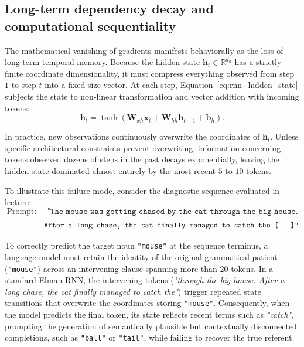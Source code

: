 \documentclass[../../../main.tex]{subfiles}
\begin{document}
\subsection{Long-term dependency decay and computational sequentiality}
\label{subsec:rnn_long_term_decay_sequentiality}

The mathematical vanishing of gradients manifests behaviorally as the loss of long-term temporal memory. Because the hidden state $\mathbf{h}_t \in \mathbb{R}^{d_h}$ has a strictly finite coordinate dimensionality, it must compress everything observed from step $1$ to step $t$ into a fixed-size vector. At each step, Equation~\ref{eq:rnn_hidden_state} subjects the state to non-linear transformation and vector addition with incoming tokens:
\begin{equation}
\mathbf{h}_t = \tanh\left(\mathbf{W}_{xh} \mathbf{x}_t + \mathbf{W}_{hh} \mathbf{h}_{t-1} + \mathbf{b}_h\right).
\end{equation}

In practice, new observations continuously overwrite the coordinates of $\mathbf{h}_t$. Unless specific architectural constraints prevent overwriting, information concerning tokens observed dozens of steps in the past decays exponentially, leaving the hidden state dominated almost entirely by the most recent $5$ to $10$ tokens.

To illustrate this failure mode, consider the diagnostic sequence evaluated in lecture:
\begin{equation}
\text{Prompt: } \quad \texttt{"The mouse was getting chased by the cat through the big house.}
\end{equation}
\begin{equation}
\quad \quad \quad \quad \quad \texttt{After a long chase, the cat finally managed to catch the [ \quad ]"}
\end{equation}

To correctly predict the target noun \texttt{"mouse"} at the sequence terminus, a language model must retain the identity of the original grammatical patient (\texttt{"mouse"}) across an intervening clause spanning more than 20 tokens. In a standard Elman RNN, the intervening tokens (\textit{"through the big house. After a long chase, the cat finally managed to catch the"}) trigger repeated state transitions that overwrite the coordinates storing \texttt{"mouse"}. Consequently, when the model predicts the final token, its state reflects recent terms such as \textit{"catch"}, prompting the generation of semantically plausible but contextually disconnected completions, such as \texttt{"ball"} or \texttt{"tail"}, while failing to recover the true referent.
\end{document}
